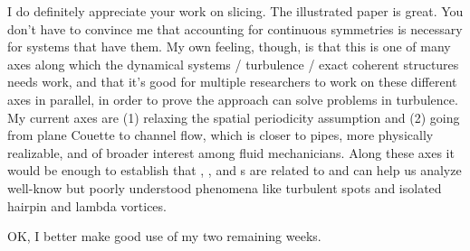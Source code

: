 \begin{description}
I do definitely appreciate your work on slicing. The illustrated paper
is great. You don't have to convince me that accounting for continuous
symmetries is necessary for systems that have them. My own feeling,
though, is that this is one of many axes along which the dynamical
systems / turbulence / exact coherent structures needs work, and that
it's good for multiple researchers to work on these different axes in
parallel, in order to prove the approach can solve problems in
turbulence. My current axes are (1) relaxing the spatial periodicity
assumption and (2) going from plane Couette to channel flow, which is
closer to pipes, more physically realizable, and of broader interest
among fluid mechanicians. Along these axes it would be enough to
establish that \eqva, \reqva, and \rpo s are related to and can help us
analyze well-know but poorly understood phenomena like turbulent
spots and isolated hairpin and lambda vortices.

OK, I better make good use of my two remaining weeks.

\end{description}
